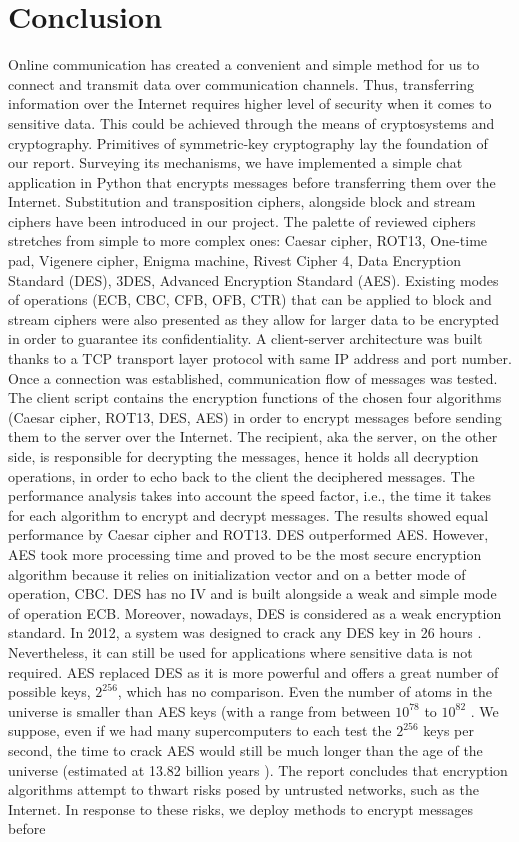 \section{Conclusion}

Online communication has created a convenient and simple method for us to connect and transmit data over communication channels. Thus, transferring information over the Internet requires higher level of security when it comes to sensitive data. This could be achieved through the means of cryptosystems and cryptography. Primitives of symmetric-key cryptography lay the foundation of our report. Surveying its mechanisms, we have implemented a simple chat application in Python that encrypts messages before transferring them over the Internet. Substitution and transposition ciphers, alongside block and stream ciphers have been introduced in our project. The palette of reviewed ciphers stretches from simple to more complex ones: Caesar cipher, ROT13, One-time pad, Vigenere cipher, Enigma machine, Rivest Cipher 4, Data Encryption Standard (DES), 3DES, Advanced Encryption Standard (AES). Existing modes of operations (ECB, CBC, CFB, OFB, CTR) that can be applied to block and stream ciphers were also presented as they allow for larger data to be encrypted in order to guarantee its confidentiality. A client-server architecture was built thanks to a TCP transport layer protocol with same IP address and port number. Once a connection was established, communication flow of messages was tested. The client script contains the encryption functions of the chosen four algorithms (Caesar cipher, ROT13, DES, AES) in order to encrypt messages before sending them to the server over the Internet. The recipient, aka the server, on the other side, is responsible for decrypting the messages, hence it holds all decryption operations, in order to echo back to the client the deciphered messages. The performance analysis takes into account the speed factor, i.e., the time it takes for each algorithm to encrypt and decrypt messages. The results showed equal performance by Caesar cipher and ROT13. DES outperformed AES. However, AES took more processing time and proved to be the most secure encryption algorithm because it relies on initialization vector and on a better mode of operation, CBC. DES has no IV and is built alongside a weak and simple mode of operation ECB. Moreover, nowadays, DES is considered as a weak encryption standard. In 2012, a system was designed to crack any DES key in 26 hours \cite{crack.sh}. Nevertheless, it can still be used for applications where sensitive data is not required. AES replaced DES as it is more powerful and offers a great number of possible keys, $2^{256}$, which has no comparison. Even the number of atoms in the universe is smaller than AES keys (with a range from between $10^{78}$ to $10^{82}$ \cite{atoms}. We suppose, even if we had many supercomputers to each test the $2^{256}$ keys per second, the time to crack AES would still be much longer than the age of the universe (estimated at 13.82 billion years \cite{universe}). The report concludes that encryption algorithms attempt to thwart risks posed by untrusted networks, such as the Internet. In response to these risks, we deploy methods to encrypt messages before 